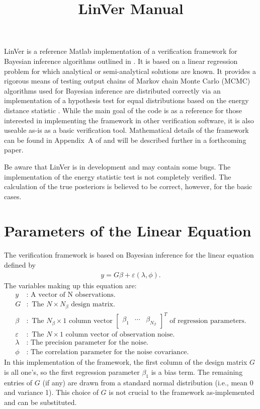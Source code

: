 \documentclass{book}
\title{LinVer Manual}
\begin{document}
\maketitle

LinVer is a reference Matlab implementation of a verification framework for Bayesian inference algorithms 
outlined
in \cite{adams01}. It is
based on a linear regression problem for which analytical or semi-analytical solutions are known.  It provides a 
rigorous means of testing output chains of Markov chain Monte Carlo (MCMC) algorithms used for 
Bayesian inference are distributed correctly
via an implementation of a hypothesis test for equal distributions based on the energy distance
statistic \cite{szekely01}. While the main goal of the code is as a reference for those interested in 
implementing the framework in other verification software, it is also useable as-is as a basic verification
tool. Mathematical details of the framework can be found in Appendix~A of \cite{adams01} and will
be described further in a forthcoming paper. 

Be aware that LinVer is in development and may contain some bugs. The implementation
of the energy statistic test is not completely verified. The calculation of the true posteriors is believed
to be correct, however, for the basic cases. 

\chapter{Parameters of the Linear Equation}
\label{chap:lineqn}
The verification framework is based on Bayesian inference for the linear equation defined by
\begin{align*}
y = G\beta + \varepsilon(\lambda, \phi).
\end{align*}
The variables making up this equation are:
\begin{align*}
y &: \text{ A vector of N observations.} \\
G &: \text{ The } N \times N_\beta \text{ design matrix.} \\
\beta &: \text{ The } N_\beta \times 1 \text{ column vector } 
	     \begin{bmatrix}\beta_1 & \cdots & \beta_{N_\beta}\end{bmatrix}^T 
	     \text{ of regression parameters.} \\
\varepsilon &: \text{ The } N \times 1 \text{ column vector of observation noise.} \\
\lambda &: \text{ The precision parameter for the noise.} \\
\phi &: \text{ The correlation parameter for the noise covariance.}
\end{align*}
In this implementation of the framework, the first column of the design matrix $G$ is all one's, so the first
regression parameter $\beta_1$ is a bias term. The remaining entries of $G$ (if any) are drawn from a
standard normal distribution (i.e., mean 0 and variance 1). This choice of $G$ is not crucial to the framework
as-implemented and can be substituted. 
\end{document}
